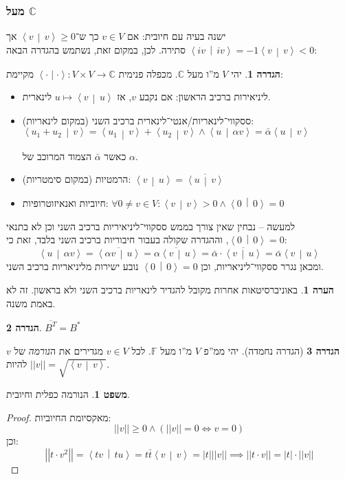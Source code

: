 \documentclass[a4paper]{article}
\newcommand\C     {\mathbb{C}}
\newcommand\ra    {\rangle}
\newcommand\la    {\langle}
\newcommand\ol    {\overline}
\newcommand\F         {\mathbb{F}}
\newcommand\co        {\colon}
\newcommand\norm[1]   {\left \vert \left \vert #1 \right \vert \right \vert}
\newcommand\smut      {\left \la \cdot \mid \cdot \right \ra}
\newcommand\mut [2]   {\left \la #1 \,\middle|\, #2 \right \ra}
\newcommand\ag        {\alpha}
\newcommand\sof[1]    {\left | #1 \right |}
\theoremstyle{definition}
\newtheorem{Theorem}{\color{myblue}משפט}
\newtheorem{Definition}{\color{mygreen}הגדרה}
\newtheorem{Remark}{\color{mycyan}הערה}
\newcommand\theo  [1] {\begin{Theorem}#1\end{Theorem}}
\newcommand\defi  [1] {\begin{Definition}#1\end{Definition}}
\newcommand\rmark [1] {\begin{Remark}#1\end{Remark}}
\begin{document}
	\subsubsection{מעל $\C$}
	ישנה בעיה עם חיובית: אם $v \in V$ כך ש־$\mut{v}{v} \ge 0$ אך $\mut{iv}{iv} = -1\mut{v}{v} < 0$ סתירה. לכן, במקום זאת, נשתמש בהגדרה הבאה: 
	\defi{יהי $V$ מ''ו מעל $\C$. מכפלה פנימית $\smut \co V \times V \to \C$ מקיימת: 
		\begin{itemize}
			\item ליניאירות ברכיב הראשון: אם נקבע $v$, אז $u \mapsto \mut{v}{u}$ לינארית. 
			\item ססקווי־לינאריות/אנטי־לינארית ברכיב השני (במקום לינאריות): \hfill $\mut{u_1 + u_2}{v} = \mut{u_1}{v} + \mut{u_2}{v} \land \mut{u}{\ag v} = \bar \ag \mut{u}{v}$ 
			
			כאשר $\bar \ag$ הצמוד המרוכב של $\ag$. 
			\item הרמטיות (במקום סימטריות): \hfill $\mut{v}{u} = \ol{\mut{u}{v}}$
			\item חיוביות ואנאיזוטרופיות: \hfill $\forall 0 \neq v \in V \co \mut{v}{v} > 0 \land \mut{0}{0} = 0$
	\end{itemize}}
	למעשה – נבחין שאין צורך בממש ססקווי־ליניאיריות ברכיב השני וכן לא בתנאי $\mut{0}{0} = 0$, וההגדרה שקולה בעבור חיבוריות ברכיב השני בלבד, זאת כי: 
	\[ \mut{u}{\ag v} = \ol{\mut{\ag v}{u}} = \ol{\ag \mut{v}{u}} = \bar \ag \cdot \ol{\mut{v}{u}} = \bar \ag \mut{v}{u} \]
	ומכאן נגרר ססקווי־ליניאריות, וכן $\mut{0}{0} = 0$ נובע ישירות מליניאריות ברכיב השני. 
	
	\rmark{באוניברסיטאות אחרות מקובל להגדיר לינאריות ברכיב השני ולא בראשון. זה לא באמת משנה. }
	
	
	\defi{\hfil $\ol{B^T} = B^*$}
	
	\begin{Definition}[הגדרה נחמדה]
		יהי ממ''פ $V$ מ''ו מעל $\F$. לכל $v \in V$ מגדירים את ה\textit{נורמה} של $v$ להיות $ \norm{v} = \sqrt{\mut{v}{v}} $. 
	\end{Definition}
	
	\theo{הנורמה כפלית וחיובית. }
	\begin{proof}
		מאקסיומת החיוביות: 
		\[ \norm{v} \ge 0 \land (\norm{v} = 0 \iff v = 0) \]
		וכן: 
		\[ \norm{t \cdot v^2} = \mut{tv}{tu} = t \bar t\mut{v}{v} = \sof{t}\norm{v} \implies \norm{t \cdot v} = \sof{t} \cdot \norm{v} \]
	\end{proof}
	
\end{document}
